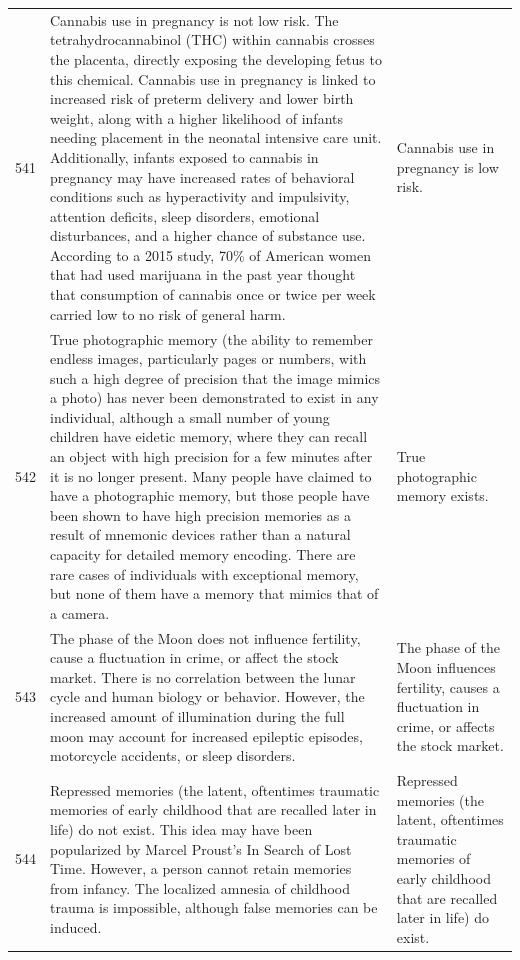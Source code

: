 \begin{tabular}{c|p{}|p{}}
541 & Cannabis use in pregnancy is not low risk. The tetrahydrocannabinol (THC) within cannabis crosses the placenta, directly exposing the developing fetus to this chemical. Cannabis use in pregnancy is linked to increased risk of preterm delivery and lower birth weight, along with a higher likelihood of infants needing placement in the neonatal intensive care unit. Additionally, infants exposed to cannabis in pregnancy may have increased rates of behavioral conditions such as hyperactivity and impulsivity, attention deficits, sleep disorders, emotional disturbances, and a higher chance of substance use. According to a 2015 study, 70\% of American women that had used marijuana in the past year thought that consumption of cannabis once or twice per week carried low to no risk of general harm. & Cannabis use in pregnancy is low risk. \\
542 & True photographic memory (the ability to remember endless images, particularly pages or numbers, with such a high degree of precision that the image mimics a photo) has never been demonstrated to exist in any individual, although a small number of young children have eidetic memory, where they can recall an object with high precision for a few minutes after it is no longer present. Many people have claimed to have a photographic memory, but those people have been shown to have high precision memories as a result of mnemonic devices rather than a natural capacity for detailed memory encoding. There are rare cases of individuals with exceptional memory, but none of them have a memory that mimics that of a camera. & True photographic memory exists. \\
543 & The phase of the Moon does not influence fertility, cause a fluctuation in crime, or affect the stock market. There is no correlation between the lunar cycle and human biology or behavior. However, the increased amount of illumination during the full moon may account for increased epileptic episodes, motorcycle accidents, or sleep disorders. & The phase of the Moon influences fertility, causes a fluctuation in crime, or affects the stock market. \\
544 & Repressed memories (the latent, oftentimes traumatic memories of early childhood that are recalled later in life) do not exist. This idea may have been popularized by Marcel Proust's In Search of Lost Time. However, a person cannot retain memories from infancy. The localized amnesia of childhood trauma is impossible, although false memories can be induced. & Repressed memories (the latent, oftentimes traumatic memories of early childhood that are recalled later in life) do exist. \\

\end{tabular}
